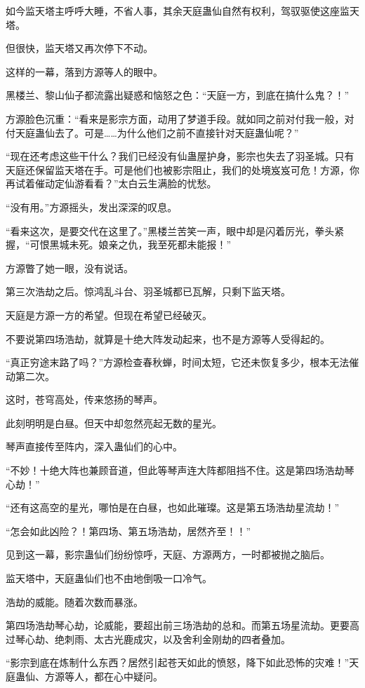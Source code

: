 \begin{this_body}
如今监天塔主呼呼大睡，不省人事，其余天庭蛊仙自然有权利，驾驭驱使这座监天塔。

但很快，监天塔又再次停下不动。

这样的一幕，落到方源等人的眼中。

黑楼兰、黎山仙子都流露出疑惑和恼怒之色：“天庭一方，到底在搞什么鬼？！”

方源脸色沉重：“看来是影宗方面，动用了梦道手段。就如同之前对付我一般，对付天庭蛊仙去了。可是……为什么他们之前不直接针对天庭蛊仙呢？”

“现在还考虑这些干什么？我们已经没有仙蛊屋护身，影宗也失去了羽圣城。只有天庭还保留监天塔在手。可是他们也被影宗阻止，我们的处境岌岌可危！方源，你再试着催动定仙游看看？”太白云生满脸的忧愁。

“没有用。”方源摇头，发出深深的叹息。

“看来这次，是要交代在这里了。”黑楼兰苦笑一声，眼中却是闪着厉光，拳头紧握，“可恨黑城未死。娘亲之仇，我至死都未能报！”

方源瞥了她一眼，没有说话。

第三次浩劫之后。惊鸿乱斗台、羽圣城都已瓦解，只剩下监天塔。

天庭是方源一方的希望。但现在希望已经破灭。

不要说第四场浩劫，就算是十绝大阵发动起来，也不是方源等人受得起的。

“真正穷途末路了吗？”方源检查春秋蝉，时间太短，它还未恢复多少，根本无法催动第二次。

这时，苍穹高处，传来悠扬的琴声。

此刻明明是白昼。但天中却忽然亮起无数的星光。

琴声直接传至阵内，深入蛊仙们的心中。

“不妙！十绝大阵也兼顾音道，但此等琴声连大阵都阻挡不住。这是第四场浩劫琴心劫！”

“还有这高空的星光，哪怕是在白昼，也如此璀璨。这是第五场浩劫星流劫！”

“怎会如此凶险？！第四场、第五场浩劫，居然齐至！！”

见到这一幕，影宗蛊仙们纷纷惊呼，天庭、方源两方，一时都被抛之脑后。

监天塔中，天庭蛊仙们也不由地倒吸一口冷气。

浩劫的威能。随着次数而暴涨。

第四场浩劫琴心劫，论威能，要超出前三场浩劫的总和。而第五场星流劫。更要高过琴心劫、绝刺雨、太古光鹿成灾，以及舍利金刚劫的四者叠加。

“影宗到底在炼制什么东西？居然引起苍天如此的愤怒，降下如此恐怖的灾难！”天庭蛊仙、方源等人，都在心中疑问。


\end{this_body}

